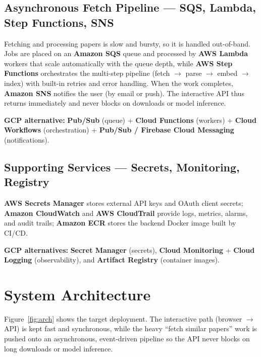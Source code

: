 \documentclass[12pt,a4paper]{article}
\begin{document}
\subsection{Asynchronous Fetch Pipeline --- SQS, Lambda, Step Functions, SNS}
Fetching and processing papers is slow and bursty, so it is handled
out-of-band. Jobs are placed on an \textbf{Amazon SQS} queue and processed by
\textbf{AWS Lambda} workers that scale automatically with the queue depth,
while \textbf{AWS Step Functions} orchestrates the multi-step pipeline
(fetch $\to$ parse $\to$ embed $\to$ index) with built-in retries and error
handling. When the work completes, \textbf{Amazon SNS} notifies the user (by
email or push). The interactive API thus returns immediately and never blocks
on downloads or model inference.
\begin{gcpbox}
\textbf{GCP alternative:} \textbf{Pub/Sub} (queue) + \textbf{Cloud Functions}
(workers) + \textbf{Cloud Workflows} (orchestration) + \textbf{Pub/Sub /
Firebase Cloud Messaging} (notifications).
\end{gcpbox}

\subsection{Supporting Services --- Secrets, Monitoring, Registry}
\textbf{AWS Secrets Manager} stores external API keys and OAuth client
secrets; \textbf{Amazon CloudWatch} and \textbf{AWS CloudTrail} provide logs,
metrics, alarms, and audit trails; \textbf{Amazon ECR} stores the backend
Docker image built by CI/CD.
\begin{gcpbox}
\textbf{GCP alternatives:} \textbf{Secret Manager} (secrets), \textbf{Cloud
Monitoring} + \textbf{Cloud Logging} (observability), and \textbf{Artifact
Registry} (container images).
\end{gcpbox}

\section{System Architecture}

Figure~\ref{fig:arch} shows the target deployment. The interactive path
(browser $\to$ API) is kept fast and synchronous, while the heavy ``fetch
similar papers'' work is pushed onto an asynchronous, event-driven pipeline so
the API never blocks on long downloads or model inference.
\end{document}
